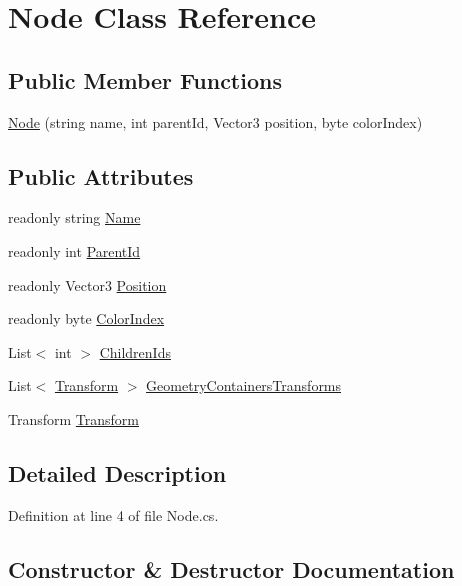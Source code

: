 \hypertarget{class_node}{}\section{Node Class Reference}
\label{class_node}
\subsection*{Public Member Functions}
\begin{DoxyCompactItemize}
\item 
\mbox{\hyperlink{class_node_a6fedf73b2cdbb61cb5c9cd810340210a}{Node}} (string name, int parent\+Id, Vector3 position, byte color\+Index)
\end{DoxyCompactItemize}
\subsection*{Public Attributes}
\begin{DoxyCompactItemize}
\item 
readonly string \mbox{\hyperlink{class_node_a3616974f5d2d3cb5103f3ecc6f839cf6}{Name}}
\item 
readonly int \mbox{\hyperlink{class_node_a211f252da47c86c6395111473af56116}{Parent\+Id}}
\item 
readonly Vector3 \mbox{\hyperlink{class_node_a4ab676883b2af5ab37f07c1d41dfe93e}{Position}}
\item 
readonly byte \mbox{\hyperlink{class_node_a2255f55bc7904392510365aa7c7069f6}{Color\+Index}}
\item 
List$<$ int $>$ \mbox{\hyperlink{class_node_ac49c69569aa07d54598b6b793ba26a31}{Children\+Ids}}
\item 
List$<$ \mbox{\hyperlink{class_node_aa16042fa0253f5e0d97abdc5857363a6}{Transform}} $>$ \mbox{\hyperlink{class_node_ad1d0767136bf9f05acac77e77388a796}{Geometry\+Containers\+Transforms}}
\item 
Transform \mbox{\hyperlink{class_node_aa16042fa0253f5e0d97abdc5857363a6}{Transform}}
\end{DoxyCompactItemize}


\subsection{Detailed Description}


Definition at line 4 of file Node.\+cs.



\subsection{Constructor \& Destructor Documentation}
\mbox{\label{class_node_a6fedf73b2cdbb61cb5c9cd810340210a}} 
